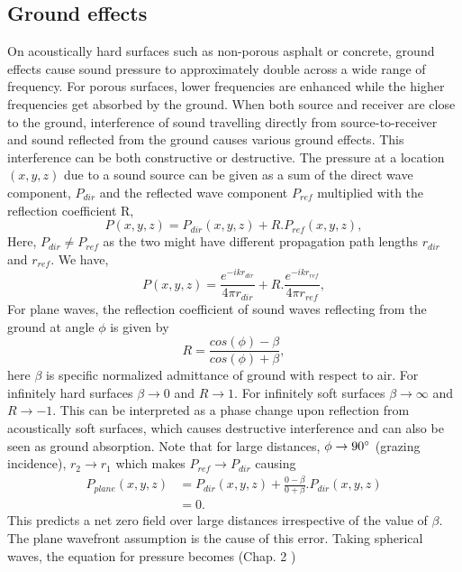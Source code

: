 \subsection{Ground effects}\label{sec:ground}
On acoustically hard surfaces such as non-porous asphalt or concrete, ground effects cause sound pressure to approximately double across a wide range of frequency. For porous surfaces, lower frequencies are enhanced while the higher frequencies get absorbed by the ground. When both source and receiver are close to the ground, interference of sound travelling directly from  source-to-receiver and sound reflected from the ground causes various ground effects. This interference can be both constructive or destructive. The pressure at a location $(x,y,z)$ due to a sound source can be given as a sum of the direct wave component, $P_{dir}$ and the reflected wave component $P_{ref}$ multiplied with the reflection coefficient R,
\begin{equation}
    P(x,y,z)=P_{dir}(x,y,z)+R.P_{ref}(x,y,z),    
\end{equation}
Here, $P_{dir} \neq P_{ref}$ as the two might have different propagation path lengths $r_ {dir}$ and $r_{ref}$. We have,
\begin{equation}
    P(x,y,z)=\frac{e^{-ikr_{dir}}}{4\pi r_{dir}} + R.\frac{e^{-ikr_{ref}}}{4\pi r_{ref}},
\end{equation}
For plane waves, the reflection coefficient of sound waves reflecting from the ground at angle $\phi$ is given by
\begin{equation}
    R = \frac{cos (\phi) - \beta}{cos (\phi) + \beta},
\end{equation}
here $\beta$ is specific normalized admittance of ground with respect to air. For infinitely hard surfaces $\beta \to 0$ and $R \to 1$. For infinitely soft surfaces  $\beta \to \infty$ and $R \to -1$. This can be interpreted as a phase change upon reflection from acoustically soft surfaces, which causes destructive interference and can also be seen as ground absorption. Note that for large distances, $\phi \to 90\degree$ (grazing incidence),  $r_2 \to r_1$ which makes $P_{ref} \to P_{dir}$ causing
\begin{equation}
\begin{split}
    P_{plane}(x,y,z)&=P_{dir}(x,y,z)+ \frac{0-\beta}{0+\beta}.P_{dir}(x,y,z)\\
            &=0.
\end{split}
\end{equation}
This predicts a net zero field over large distances irrespective of the value of $\beta$. The plane wavefront assumption is the cause of this error. Taking spherical waves, the equation for pressure becomes (Chap. 2 \cite{attenborough2006predicting})
